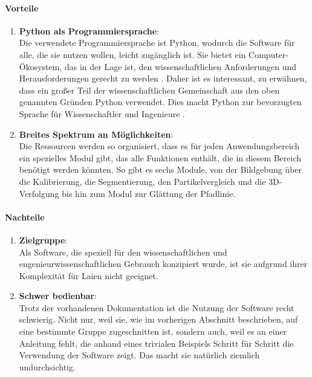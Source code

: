 	\paragraph{Vorteile}
		\begin{enumerate}
    			\item \textbf{Python als Programmiersprache}:\\
    			Die verwendete Programmiersprache ist Python, wodurch die Software für alle, die sie nutzen wollen, leicht zugänglich ist. Sie bietet ein Computer-Ökosystem, das in der Lage ist, den wissenschaftlichen Anforderungen und Herausforderungen gerecht zu werden \cite{5582063_Python_Ecosystem_Scientific_Computing} .
Daher ist es interessant, zu erwähnen, dass ein großer Teil der wissenschaftlichen Gemeinschaft aus den oben genannten Gründen Python verwendet. Dies macht Python zur bevorzugten Sprache für Wissenschaftler und Ingenieure \cite{5725235_Python_Scientists_and_Engineers}. 

    			\item \textbf{Breites Spektrum an Möglichkeiten}:\\
				Die Ressourcen werden so organisiert, dass es für jeden Anwendungsbereich ein spezielles Modul gibt, das alle Funktionen enthält, die in diesem Bereich benötigt werden könnten. So gibt es sechs Module, von der Bildgebung über die Kalibrierung, die Segmentierung, den Partikelvergleich und die 3D-Verfolgung bis hin zum Modul zur Glättung der Pfadlinie.
    			
    			
		\end{enumerate}
		
	\paragraph{Nachteile}
		\begin{enumerate}
    			\item \textbf{Zielgruppe}:\\
				Als Software, die speziell für den wissenschaftlichen und engenieurwissenschaftlichen Gebrauch konzipiert wurde, ist sie aufgrund ihrer Komplexität für Laien nicht geeignet.
				
    			\item \textbf{Schwer bedienbar}:\\
				Trotz der vorhandenen Dokumentation ist die Nutzung der Software recht schwierig. Nicht nur, weil sie, wie im vorherigen Abschnitt beschrieben, auf eine bestimmte Gruppe zugeschnitten ist, sondern auch, weil es an einer Anleitung fehlt, die anhand eines trivialen Beispiels Schritt für Schritt die Verwendung der Software zeigt.
Das macht sie natürlich ziemlich undurchsichtig.
    			
		\end{enumerate}
		

